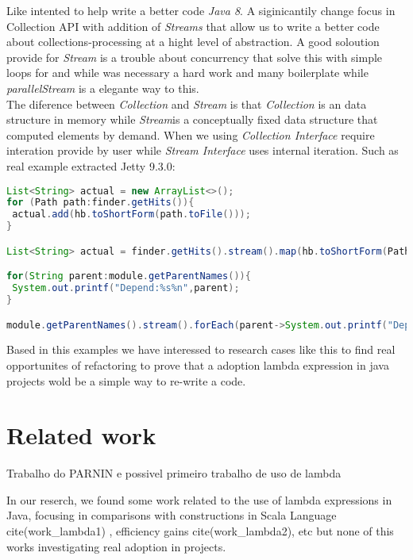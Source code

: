 \documentclass{sig-alternate-05-2015}
\begin{document}
Like intented to help write a better code \textit{Java 8}. A siginicantily change focus in Collection API with addition of \textit{Streams} that allow us to write a better code about collections-processing at a hight level of abstraction. A good soloution provide for \textit{Stream} is a trouble about concurrency that solve this with simple loops for and while was necessary a hard work and many boilerplate while \textit{parallelStream} is a elegante way to this.\\

The diference between \textit{Collection} and \textit{Stream} is that \textit{Collection} is an data structure in memory while \textit{Stream}is a conceptually fixed data structure that computed elements by demand. When we using \textit{Collection Interface} require interation provide by user while \textit{Stream Interface} uses internal iteration. Such as real example extracted Jetty 9.3.0:\\

\begin{lstlisting}[language=java]
List<String> actual = new ArrayList<>(); 
for (Path path:finder.getHits()){
 actual.add(hb.toShortForm(path.toFile()));
}

List<String> actual = finder.getHits().stream().map(hb.toShortForm(Path::toFile)).collect(toList());

for(String parent:module.getParentNames()){
 System.out.printf("Depend:%s%n",parent);
}

module.getParentNames().stream().forEach(parent->System.out.printf("Depend:%s%n",parent));
\end{lstlisting}

Based in this examples we have interessed to research cases like this to find real opportunites of refactoring to prove that a adoption lambda expression in java projects wold be a simple way to re-write a code.\\


\section{Related work}
Trabalho do PARNIN e possivel primeiro trabalho de uso de lambda 

In our reserch, we found some work related to the use of lambda expressions in Java, focusing in comparisons with constructions in Scala Language cite(work\_lambda1) , efficiency gains cite(work\_lambda2), etc but none of this works investigating real adoption in projects.
\end{document}
